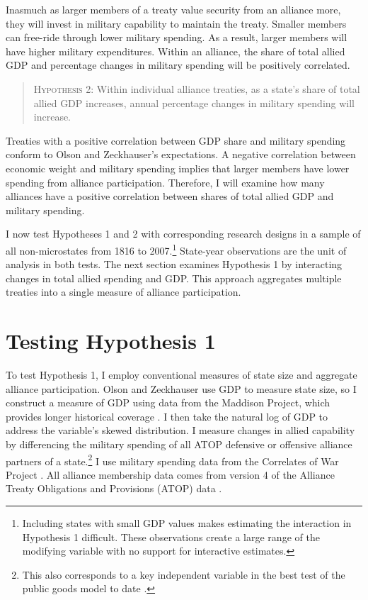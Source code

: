 \documentclass[12pt]{article}
\begin{document}
Inasmuch as larger members of a treaty value security from an alliance more, they will invest in military capability to maintain the treaty.
Smaller members can free-ride through lower military spending. 
As a result, larger members will have higher military expenditures. 
Within an alliance, the share of total allied GDP and percentage changes in military spending will be positively correlated. 


\begin{quote}
\textsc{Hypothesis 2}: Within individual alliance treaties, as a state's share of total allied GDP increases, annual percentage changes in military spending will increase. 
\end{quote}


Treaties with a positive correlation between GDP share and military spending conform to Olson and Zeckhauser's expectations. 
A negative correlation between economic weight and military spending implies that larger members have lower spending from alliance participation. 
Therefore, I will examine how many alliances have a positive correlation between shares of total allied GDP and military spending.  


I now test Hypotheses 1 and 2 with corresponding research designs in a sample of all non-microstates from 1816 to 2007.\footnote{Including states with small GDP values makes estimating the interaction in Hypothesis 1 difficult. These observations create a large range of the modifying variable with no support for interactive estimates.}
State-year observations are the unit of analysis in both tests.  
The next section examines Hypothesis 1 by interacting changes in total allied spending and GDP.
This approach aggregates multiple treaties into a single measure of alliance participation. 


\section{Testing Hypothesis 1}


To test Hypothesis 1, I employ conventional measures of state size and aggregate alliance participation. 
Olson and Zeckhauser use GDP to measure state size, so I construct a measure of GDP using data from the Maddison Project, which provides longer historical coverage \citep{Boltetal2018}. 
I then take the natural log of GDP to address the variable's skewed distribution. 
I measure changes in allied capability by differencing the military spending of all ATOP defensive or offensive alliance partners of a state.\footnote{This also corresponds to a key independent variable in the best test of the public goods model to date \citep{PluemperNeumayer2015}.}
I use military spending data from the Correlates of War Project \citep{SingerCINC1988}.  
All alliance membership data comes from version 4 of the Alliance Treaty Obligations and Provisions (ATOP) data \citep{Leedsetal2002}.  
\end{document}
